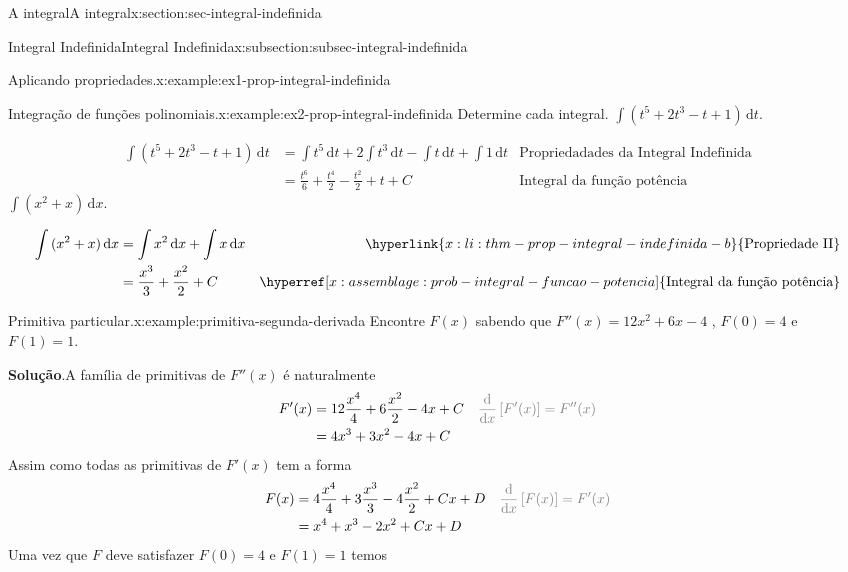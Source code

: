 \documentclass[oneside,10pt,]{article}
\newcommand{\blocktitlefont}{\relax}
\numberwithin{equation}{section}
\newcommand{\dd}{\mathrm{d}}
\newcommand{\integral}[2]{\displaystyle\int {#1}\,\dd {#2}}
\newcommand{\amp}{&}
\begin{document}
\begin{sectionptx}{A integral}{}{A integral}{}{}{x:section:sec-integral-indefinida}
\begin{subsectionptx}{Integral Indefinida}{}{Integral Indefinida}{}{}{x:subsection:subsec-integral-indefinida}
\begin{example}{Aplicando propriedades.}{x:example:ex1-prop-integral-indefinida}
%
%
\end{example}
\begin{example}{Integração de funções polinomiais.}{x:example:ex2-prop-integral-indefinida}%
Determine cada integral. \(\integral{(t^5 + 2t^3 - t + 1)}{t}\).%
 \par\smallskip%
\noindent%
\begin{align*}
\integral{(t^5 + 2t^3 - t + 1)}{t}\amp = 
\integral{t^5}{t} + 2\integral{t^3}{t} - \integral{t}{t} +
\integral{1}{t}
\amp \hyperref[x:assemblage:thm-prop-integral-indefinida]{\text{Propriedadades da Integral Indefinida}} \\
\amp = \frac{t^{6}}{6}  + \frac{t^{4}}{2} - \frac{t^{2} }{2}  + t + C \amp \hyperref[x:assemblage:prob-integral-funcao-potencia]{\text{Integral da função potência}}
\end{align*}
%
 \(\integral{(x^2+x)}{x}\).%
\par\smallskip%
\noindent%
\begin{align*}
\integral{(x^2+x)}{x}\amp = \integral{x^2}{x} + \integral{x}{x} \amp \hyperlink{x:li:thm-prop-integral-indefinida-b}{\text{Propriedade II}}\\
\amp = \frac{x^3}{3} + \frac{x^2}{2} + C \amp \hyperref[x:assemblage:prob-integral-funcao-potencia]{\text{Integral da função potência}}
\end{align*}
%
%
\end{example}
\begin{example}{Primitiva particular.}{x:example:primitiva-segunda-derivada}%
Encontre \(F(x)\) sabendo que \(F''(x)=12x^2+6x-4\) , \(F(0)=4\) e \(F(1)=1\).%
\par\smallskip%
\noindent\textbf{\blocktitlefont Solução}.\hypertarget{g:solution:idp24}{}\quad{}A família de primitivas de \(F''(x)\) é naturalmente%
\begin{align*}
F'(x) \amp = 12\frac{x^4}{4} + 6\frac{x^2}{2} -4x+ C \amp  \color{gray}{\frac{\dd}{\dd x}\left[F'(x)\right]=F''(x)} \\
\amp =4x^3 + 3x^2-4x+C 
\end{align*}
Assim como todas as primitivas de \(F'(x)\) tem a forma%
\begin{align*}
F(x)\amp = 4\frac{x^4}{4} + 3\frac{x^3}{3} -4\frac{x^2}{2} + Cx + D \amp \color{gray}{\frac{\dd}{\dd x}\left[F(x)\right]=F'(x)} \\
\amp = x^4 + x^3-2x^2+Cx+D 
\end{align*}
Uma vez que \(F\) deve satisfazer \(F(0)=4\) e \(F(1)=1\) temos%
\begin{align*}

\end{align*}
\end{example}
\end{subsectionptx}
\end{sectionptx}
\end{document}
